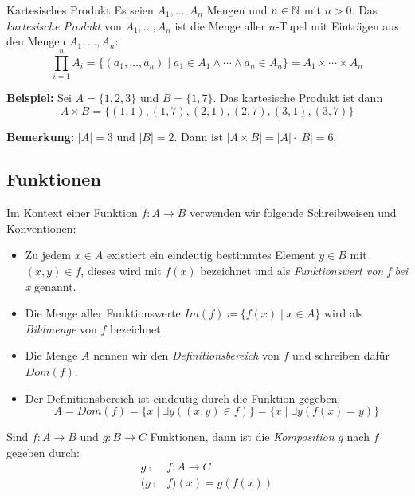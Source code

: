\begin{definition}{Kartesisches Produkt}
    Es seien $A_1,\dots,A_n$ Mengen und $n \in \mathbb{N}$ mit $n > 0$.
    Das \emph{kartesische Produkt} von $A_1,\dots,A_n$ ist die Menge aller $n$-Tupel mit Einträgen aus den Mengen $A_1,\dots,A_n$: \[\prod^n_{i = 1} A_i = \{(a_1,...,a_n) \mid a_1 \in A_1 \land \cdots \land a_n \in A_n\} = A_1 \times \cdots \times A_n\]
\end{definition}

\textbf{Beispiel:} Sei $A = \{1,2,3\}$ und $B = \{1,7\}$.
Das kartesische Produkt ist dann \[A \times B = \{(1,1),(1,7),(2,1),(2,7),(3,1),(3,7)\}\]

\vspace{-\topsep}

\textbf{Bemerkung:} $|A| = 3$ und $|B| = 2$.
Dann ist $|A \times B| = |A| \cdot |B| = 6$.

\subsection{Funktionen}\label{subsec:funktionen}

\begin{definition}{}
    Im Kontext einer Funktion $f : A \rightarrow B$ verwenden wir folgende Schreibweisen und Konventionen:
    \begin{itemize}
        \item Zu jedem $x \in A$ existiert ein eindeutig bestimmtes Element $y \in B$ mit $(x,y) \in f$, dieses wird mit $f(x)$ bezeichnet und als \emph{Funktionswert von f bei x} genannt.
        \item Die Menge aller Funktionswerte $Im(f) \coloneqq \{f(x) \mid x \in A\}$ wird als \emph{Bildmenge} von $f$ bezeichnet.
        \item Die Menge $A$ nennen wir den \emph{Definitionsbereich} von $f$ und schreiben dafür $Dom(f)$.
        \item Der Definitionsbereich ist eindeutig durch die Funktion gegeben: \[A = Dom(f) = \{x \mid \exists y ((x,y) \in f)\} = \{x \mid \exists y (f(x) = y)\}\]
    \end{itemize}
\end{definition}

\begin{definition}{}
    Sind $f : A \rightarrow B$ und $g : B \rightarrow C$ Funktionen, dann ist die \emph{Komposition} $g$ nach $f$ gegeben durch:
    \begin{align*}
        g \comp &f : A \rightarrow C\\
        (g \comp &f)(x) = g(f(x))
    \end{align*}
\end{definition}

